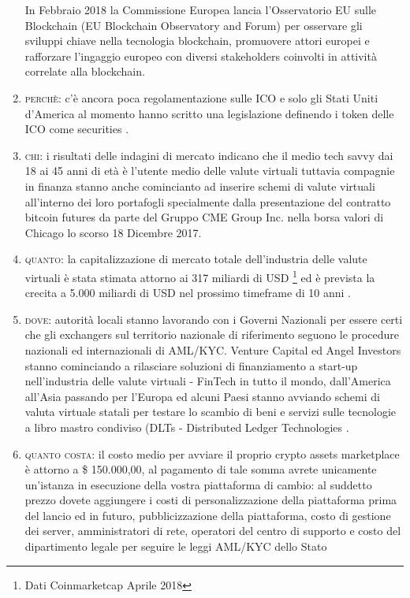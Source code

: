 \documentclass[11pt,fleqn,oneside]{book} %
\begin{document}
\begin{enumerate}
	In Febbraio 2018 la Commissione Europea lancia l'Osservatorio EU sulle Blockchain (EU Blockchain Observatory and Forum) \cite{EUBOaF} 
	per osservare gli sviluppi chiave nella tecnologia blockchain, promuovere attori europei e rafforzare l'ingaggio europeo con
	diversi stakeholders coinvolti in attività correlate alla blockchain.
	\item \textsc{perchè}: c'è ancora poca regolamentazione sulle ICO e solo gli Stati Uniti d'America al momento
	hanno scritto una legislazione definendo i token delle ICO come securities \cite{SECICO}.
	\item \textsc{chi}: i risultati delle indagini di mercato indicano che il medio tech savvy dai 18 ai 45 anni di età è
	l'utente medio delle valute virtuali tuttavia compagnie in finanza stanno anche comincianto ad inserire schemi di 
	valute virtuali all'interno dei loro portafogli specialmente dalla presentazione del contratto bitcoin futures 
	da parte del Gruppo CME Group Inc. nella borsa valori di Chicago lo scorso 18 Dicembre 2017.
	\item \textsc{quanto}: la capitalizzazione di mercato totale dell'industria delle valute virtuali è stata stimata attorno
	ai 317 miliardi di USD \footnote{Dati Coinmarketcap Aprile 2018}
	ed è prevista la crecita a 5.000 miliardi di USD nel prossimo timeframe di 10 anni \cite{cryptoMCTenYears}.
	\item \textsc{dove}: autorità locali stanno lavorando con i Governi Nazionali per essere certi che gli exchangers sul 
	territorio nazionale di riferimento seguono le procedure nazionali ed internazionali di AML/KYC.
	Venture Capital ed Angel Investors stanno cominciando a rilasciare soluzioni di finanziamento a start-up nell'industria delle
	valute virtuali - FinTech in tutto il mondo, dall'America all'Asia passando per l'Europa ed alcuni Paesi
	stanno avviando schemi di valuta virtuale statali per testare lo scambio di beni e servizi sulle tecnologie a libro 
	mastro condiviso (DLTs - Distributed Ledger Technologies \cite{petro}.
	\item \textsc{quanto costa}: il costo medio per avviare il proprio crypto assets marketplace è attorno a \$ 150.000,00, al pagamento di tale somma
	avrete unicamente un'istanza in esecuzione della vostra piattaforma di cambio: al suddetto prezzo dovete aggiungere i costi
	di personalizzazione della piattaforma prima del lancio ed in futuro, pubblicizzazione della piattaforma, costo di gestione dei server, 
	amministratori di rete, operatori del centro di supporto e costo del dipartimento legale per seguire le leggi AML/KYC dello Stato

\end{enumerate}
\end{document}
